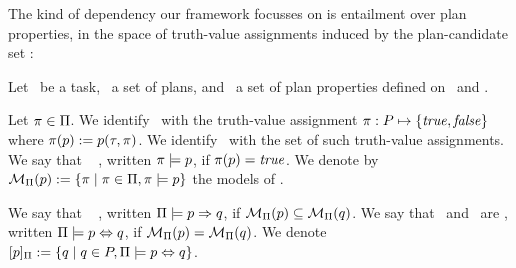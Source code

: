 The kind of dependency our framework focusses on is entailment over
plan properties, in the space of truth-value assignments induced by
the plan-candidate set \plans:



\begin{definition}
Let \task\ be a task, \plans\ a set of plans, and \props\ a set of
plan properties defined on \task\ and \plans.

Let $\pi \in \Pi$. We identify \plan\ with the truth-value
assignment $\pi : P \mapsto \{\mathit{true}, \mathit{false}\}$ where
$\pi(p) := p(\tau,\pi)$. We identify \plans\ with the set
of such truth-value assignments. We say that
\plan\  \prop, written $\pi \models p$, if
$\pi(p) = \mathit{true}$. We denote by ${\cal M}_{\Pi}(p) :=
\{\pi \mid \pi \in \Pi, \pi \models p\}$ the models of
\prop. 
%

We say that \prop\  \propq, written
$\Pi \models p \Rightarrow q$, if ${\cal M}_{\Pi}(p)
\subseteq {\cal M}_{\Pi}(q)$.
%
We say that \prop\ and \propq\ are ,
written $\Pi \models p \Leftrightarrow q$, if ${\cal M}_{\Pi}(p) =
{\cal M}_{\Pi}(q)$. We denote $[p]_{\Pi} :=
\{q \mid q \in P, \Pi \models p \Leftrightarrow q\}$.
\end{definition}


